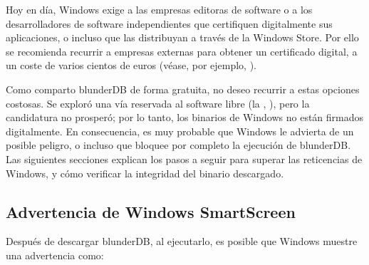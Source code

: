 \documentclass[letterpaper,10pt,spanish]{sphinxmanual}
\begin{document}
\sphinxAtStartPar
Hoy en día, Windows exige a las empresas editoras de software o a los desarrolladores de software independientes que certifiquen digitalmente sus aplicaciones, o incluso que las distribuyan a través de la Windows Store. Por ello se recomienda recurrir a empresas externas para obtener un certificado digital, a un coste de varios cientos de euros (véase, por ejemplo,  ).

\sphinxAtStartPar
Como comparto blunderDB de forma gratuita, no deseo recurrir a estas opciones costosas. Se exploró una vía  reservada al software libre (la , ), pero la candidatura no prosperó; por lo tanto, los binarios de Windows no están firmados digitalmente. En consecuencia, es muy probable que Windows le advierta de un posible peligro, o incluso que bloquee por completo la ejecución de blunderDB. Las siguientes secciones explican los pasos a seguir para superar las reticencias de Windows, y cómo verificar la integridad del binario descargado.


\subsection{Advertencia de Windows SmartScreen}
\label{\detokenize{annexe_windows_securite:avertissement-windows-smartscreen}}
\sphinxAtStartPar
Después de descargar blunderDB, al ejecutarlo, es posible que Windows muestre una advertencia como:

\begin{figure}[htbp]
\centering

\noindent{}
\end{figure}
\end{document}
